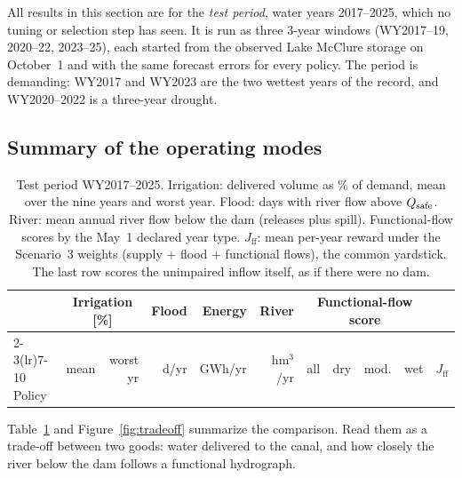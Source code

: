 All results in this section are for the \emph{test period}, water years
2017--2025, which no tuning or selection step has seen. It is run as three
3-year windows (WY2017--19, 2020--22, 2023--25), each started from the
observed Lake McClure storage on October~1 and with the same forecast
errors for every policy. The period is demanding: WY2017 and WY2023 are
the two wettest years of the record, and WY2020--2022 is a three-year
drought.

\subsection{Summary of the operating modes}

\begin{table}[h]
\centering\small
\setlength{\tabcolsep}{4pt}
\begin{tabular}{@{}lrrrrrrrrrr@{}}
\toprule
 & \multicolumn{2}{c}{Irrigation [\%]} & Flood & Energy & River & \multicolumn{4}{c}{Functional-flow score} & \\
\cmidrule(lr){2-3}\cmidrule(lr){7-10}
Policy & mean & worst yr & d/yr & GWh/yr & hm$^3$/yr & all & dry & mod. & wet & $J_{\mathrm{ff}}$\\
\midrule

\bottomrule
\end{tabular}
\caption{Test period WY2017--2025. Irrigation: delivered volume as \% of
demand, mean over the nine years and worst year. Flood: days with river
flow above $Q_{\mathrm{safe}}$. River: mean annual river flow below the dam (releases
plus spill). Functional-flow scores by the May~1 declared year type.
$J_{\mathrm{ff}}$: mean per-year reward under the Scenario~3 weights
(supply $+$ flood $+$ functional flows), the common yardstick. The last row
scores the unimpaired inflow itself, as if there were no dam.}
\label{tab:test}
\end{table}

Table~\ref{tab:test} and Figure~\ref{fig:tradeoff} summarize the
comparison. Read them as a trade-off between two goods: water delivered
to the canal, and how closely the river below the dam follows a
functional hydrograph.

